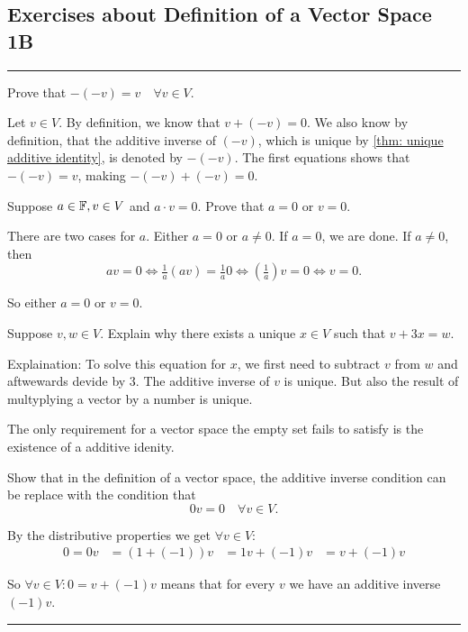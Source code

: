 \subsection*{Exercises about Definition of a Vector Space 1B}
\hrule
\phantom{.}

\begin{xrcs}
  Prove that $-(-v) = v \quad \forall v \in V.$
\end{xrcs}
\begin{prf}
  Let $v \in V$. By definition, we know that $v + (-v) = 0$. We also know by definition, that the additive inverse of $(-v)$, which is unique by \ref{thm: unique additive identity}, is denoted by $-(-v)$. The first equations shows that $-(-v) = v$, making $-(-v) + (-v) = 0$.
\end{prf}

\begin{xrcs}
  Suppose $a \in \mathbb{F}, v \in V$ and $a \cdot v = 0$. Prove that $a=0$ or $v=0$.
\end{xrcs}
\begin{prf}
  There are two cases for $a$. Either $a=0$ or $a\neq 0$. If $a=0$, we are done. If $a \neq 0$, then
  \[
    av=0 \iff \tfrac{1}{a}(av)=\tfrac{1}{a}0 \iff \left(\tfrac{1}{a} \right)v = 0 \iff v = 0.
  \]

  So either $a=0$ or $v=0$.
\end{prf}

\begin{xrcs}
  Suppose $v,w \in V$. Explain why there exists a unique $x \in V$ such that $v + 3x = w$.

  Explaination: To solve this equation for $x$, we first need to subtract $v$ from $w$ and aftwewards devide by $3$. The additive inverse of $v$ is unique. But also the result of multyplying a vector by a number is unique.
\end{xrcs}

\begin{xrcs}
  The only requirement for a vector space the empty set fails to satisfy is the existence of a additive idenity.
\end{xrcs}

\begin{xrcs}
  Show that in the definition of a vector space, the additive inverse condition can be replace with the condition that
  \[
    0v = 0 \quad \forall v \in V.
  \]
\end{xrcs}
\begin{prf}
  By the distributive properties we get $\forall v \in V:$
  \[
  \begin{aligned}
    0 = 0v &= (1 + (-1))v
    &= 1v + (-1)v
    &= v + (-1)v
  \end{aligned}
  \]

  So $\forall v \in V: 0= v + (-1)v$ means that for every $v$ we have an additive inverse $(-1)v$.
\end{prf}
\phantom{.}
\hrule

